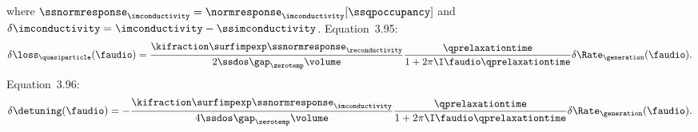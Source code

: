 where
$\ssnormresponse_{\imconductivity} = \normresponse_{\imconductivity}[\ssqpoccupancy]$
and 
$\delta\imconductivity = \imconductivity - \ssimconductivity$.
Equation~3.95:
\begin{equation*}
\delta\loss_\quasiparticle(\faudio)
  =
  \frac{\kifraction \surfimpexp \ssnormresponse_{\reconductivity}}{2 \ssdos \gap_\zerotemp \volume}
  \frac{\qprelaxationtime}{1 + 2 \pi \I \faudio \qprelaxationtime}
  \delta\Rate_\generation(\faudio).
\end{equation*}
Equation~3.96:
\begin{equation*}
\delta\detuning(\faudio)
  =
  -\frac{\kifraction \surfimpexp \ssnormresponse_{\imconductivity}}{4 \ssdos \gap_\zerotemp \volume}
  \frac{\qprelaxationtime}{1 + 2 \pi \I \faudio \qprelaxationtime}
  \delta\Rate_\generation(\faudio).
\end{equation*}
